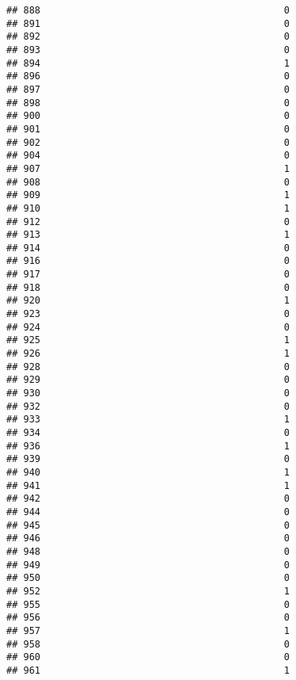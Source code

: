 \documentclass[
]{article}
\begin{document}
\begin{verbatim}
## 888                                           0
## 891                                           0
## 892                                           0
## 893                                           0
## 894                                           1
## 896                                           0
## 897                                           0
## 898                                           0
## 900                                           0
## 901                                           0
## 902                                           0
## 904                                           0
## 907                                           1
## 908                                           0
## 909                                           1
## 910                                           1
## 912                                           0
## 913                                           1
## 914                                           0
## 916                                           0
## 917                                           0
## 918                                           0
## 920                                           1
## 923                                           0
## 924                                           0
## 925                                           1
## 926                                           1
## 928                                           0
## 929                                           0
## 930                                           0
## 932                                           0
## 933                                           1
## 934                                           0
## 936                                           1
## 939                                           0
## 940                                           1
## 941                                           1
## 942                                           0
## 944                                           0
## 945                                           0
## 946                                           0
## 948                                           0
## 949                                           0
## 950                                           0
## 952                                           1
## 955                                           0
## 956                                           0
## 957                                           1
## 958                                           0
## 960                                           0
## 961                                           1

\end{verbatim}
\end{document}
